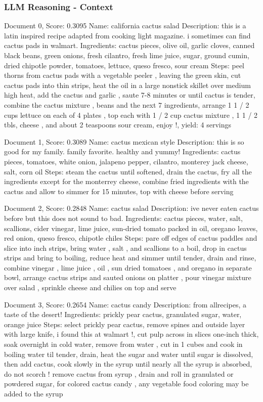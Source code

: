 \documentclass[a4paper,11pt]{article}
\begin{document}
\subsubsection{LLM Reasoning - Context}
Document 0, Score: 0.3095
Name: california cactus salad
Description: this is a latin inspired recipe adapted from cooking light magazine. i sometimes can find cactus pads in walmart.
Ingredients: cactus pieces, olive oil, garlic cloves, canned black beans, green onions, fresh cilantro, fresh lime juice, sugar, ground cumin, dried chipotle powder, tomatoes, lettuce, queso fresco, sour cream
Steps: peel thorns from cactus pads with a vegetable peeler , leaving the green skin, cut cactus pads into thin strips, heat the oil in a large nonstick skillet over medium high heat, add the cactus and garlic , saute 7-8 minutes or until cactus is tender, combine the cactus mixture , beans and the next 7 ingredients, arrange 1 1 / 2 cups lettuce on each of 4 plates , top each with 1 / 2 cup cactus mixture , 1 1 / 2 tbls, cheese , and about 2 teaspoons sour cream, enjoy !, yield: 4 servings

Document 1, Score: 0.3089
Name: cactus mexican style
Description: this is so good for my family. family favorite. healthy and yummy!
Ingredients: cactus pieces, tomatoes, white onion, jalapeno pepper, cilantro, monterey jack cheese, salt, corn oil
Steps: steam the cactus until softened, drain the cactus, fry all the ingredients except for the monterrey cheese, combine fried ingredients with the cactus and allow to simmer for 15 minutes, top with cheese before serving

Document 2, Score: 0.2848
Name: cactus salad
Description: ive never eaten cactus before but this does not sound to bad.
Ingredients: cactus pieces, water, salt, scallions, cider vinegar, lime juice, sun-dried tomato packed in oil, oregano leaves, red onion, queso fresco, chipotle chiles
Steps: pare off edges of cactus paddles and slice into inch strips, bring water , salt , and scallions to a boil, drop in cactus strips and bring to boiling, reduce heat and simmer until tender, drain and rinse, combine vinegar , lime juice , oil , sun dried tomatoes , and oregano in separate bowl, arrange cactus strips and sauted onions on platter , pour vinegar mixture over salad , sprinkle cheese and chilies on top and serve

Document 3, Score: 0.2654
Name: cactus candy
Description: from allrecipes, a taste of the desert!
Ingredients: prickly pear cactus, granulated sugar, water, orange juice
Steps: select prickly pear cactus, remove spines and outside layer with large knife, i found this at walmart !, cut pulp across in slices one-inch thick, soak overnight in cold water, remove from water , cut in 1 cubes and cook in boiling water til tender, drain, heat the sugar and water until sugar is dissolved, then add cactus, cook slowly in the syrup until nearly all the syrup is absorbed, do not scorch ! remove cactus from syrup , drain and roll in granulated or powdered sugar, for colored cactus candy , any vegetable food coloring may be added to the syrup
\end{document}
